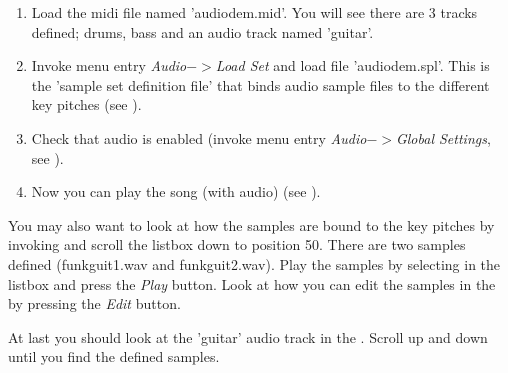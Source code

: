 \documentclass[letterpaper]{report}
\begin{document}
\begin{enumerate}

\item Load the midi file named 'audiodem.mid'. You will see there are 3 tracks
defined; drums, bass and an audio track named 'guitar'.

\item Invoke menu entry {\em Audio$->$Load Set} and load file 'audiodem.spl'.
This is the 'sample set definition file' that binds audio sample files to
the different key pitches (see ).

\item Check that audio is enabled (invoke menu entry
{\em Audio$->$Global Settings}, see ).

\item Now you can play the song (with audio) (see
).

\end{enumerate}

You may also want to look at how the samples are bound to the key pitches by
invoking
 and scroll the listbox down to
position 50. There are two samples defined (funkguit1.wav and funkguit2.wav).
Play the samples by selecting in the listbox and press the {\em Play} button.
Look at how you can edit the samples in the
 by pressing the {\em Edit} button.

At last you should look at the 'guitar' audio track in the
. Scroll
up and down until you find the defined samples.
\end{document}
